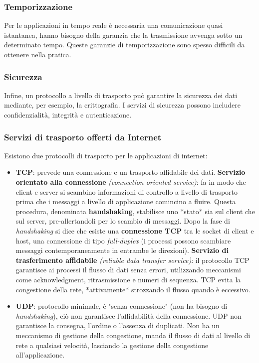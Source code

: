 \subsubsection*{Temporizzazione}
Per le applicazioni in tempo reale è necessaria una comunicazione quasi istantanea, hanno bisogno della garanzia che la trasmissione avvenga sotto un determinato tempo. Queste garanzie di temporizzazione sono spesso difficili da ottenere nella pratica.

\subsubsection*{Sicurezza}
Infine, un protocollo a livello di trasporto può garantire la sicurezza dei dati mediante, per esempio, la crittografia. I servizi di sicurezza possono includere confidenzialità, integrità e autenticazione.

\subsubsection{Servizi di trasporto offerti da Internet}
Esistono due protocolli di trasporto per le applicazioni di internet:
\begin{itemize}
  \item \textbf{TCP}: prevede una connessione e un trasporto affidabile dei dati.
    \textbf{Servizio orientato alla connessione} \textit{(connection-oriented service)}: fa in modo che client e server si scambino informazioni di controllo a livello di trasporto prima che i messaggi a livello di applicazione comincino a fluire. Questa procedura, denominata \textbf{handshaking}, stabilisce uno *stato* sia sul client che sul server, pre-allertandoli per lo scambio di messaggi.
    Dopo la fase di \textit{handshaking} si dice che esiste una \textbf{connessione TCP} tra le socket di client e host, una connessione di tipo \textit{full-duplex} (i processi possono scambiare messaggi contemporaneamente in entrambe le direzioni).
    \textbf{Servizio di trasferimento affidabile} \textit{(reliable data transfer service)}: il protocollo TCP garantisce ai processi il flusso di dati senza errori, utilizzando meccanismi come acknowledgment, ritrasmissione e numeri di sequenza.
    TCP evita la congestione della rete, *attivamente* strozzando il flusso quando è eccessivo.
  \item \textbf{UDP}: protocollo minimale, è "senza connessione" (non ha bisogno di \textit{handshaking}), ciò non garantisce l'affidabilità della connessione. UDP non garantisce la consegna, l'ordine o l'assenza di duplicati. Non ha un meccanismo di gestione della congestione, manda il flusso di dati al livello di rete a qualsiasi velocità, lasciando la gestione della congestione all'applicazione.
\end{itemize}

